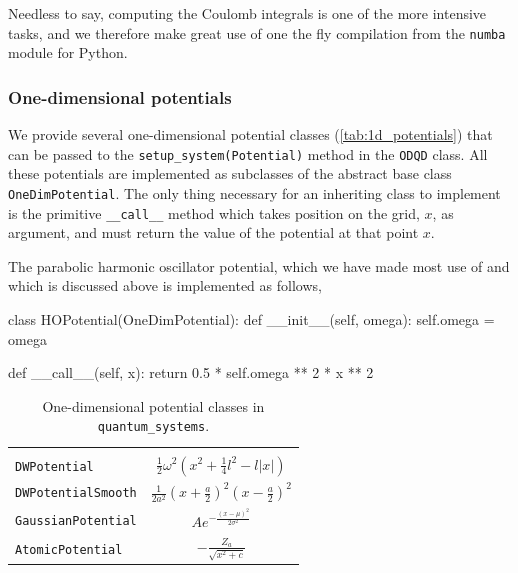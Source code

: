 Needless to say, computing the Coulomb integrals is one of the more intensive tasks,
and we therefore make great use of one the fly compilation from the 
\lstinline{numba} \cite{numba} module for Python.

\begin{figure}

\end{figure}

\subsubsection{One-dimensional potentials}
\label{sec:1d_potentials}

We provide several one-dimensional potential classes (\autoref{tab:1d_potentials})
that can be passed to 
the \lstinline{setup_system(Potential)} method in the \lstinline{ODQD} class.
All these potentials are implemented as subclasses of the abstract 
base class \lstinline{OneDimPotential}. The only thing necessary for an 
inheriting class to implement is the primitive \lstinline{__call__} method which 
takes position on the grid, $x$, as argument, and must return 
the value of the potential at that point $x$.

The parabolic harmonic oscillator potential,
which we have made most use of and which is 
discussed above is implemented as follows,
\begin{python}
class HOPotential(OneDimPotential):
    def __init__(self, omega):
        self.omega = omega

    def __call__(self, x):
        return 0.5 * self.omega ** 2 * x ** 2
\end{python}

\begin{table}
    \caption{One-dimensional potential classes in \lstinline{quantum_systems}.}
    \centering
    \begin{tabular}{l c}
        \\
        \hline\hline \\ 
        \lstinline[]$DWPotential$         & 
        $\frac{1}{2}\omega^2\left(x^2 + \frac{1}{4}l^2 - l|x| \right)$ \\ [1em]
        \lstinline[]$DWPotentialSmooth$   &
        $\frac{1}{2a^2}\left(x + \frac{a}{2}\right)^2\left(x - \frac{a}{2}\right)^2$ \\ [1em]
        \lstinline[]$GaussianPotential$   &
        $Ae^{-\frac{(x-\mu)^2}{2\sigma^2}}$ \\ [1em]
        \lstinline[]$AtomicPotential$     &
        $- \frac{Z_a}{\sqrt{x^2 + c}}$ \\ [1em] \hline\hline
    \end{tabular} 
    \label{tab:1d_potentials}
\end{table}

